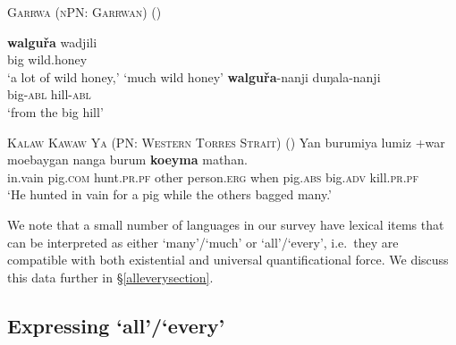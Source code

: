 \documentclass[12pt,egregdoesnotlikesansseriftitles]{scrartcl}
\begin{document}
\begin{exe}
  \ex \textsc{Garrwa (nPN: Garrwan)} \hfill(\citealt{furby77}) \label{bigquant1}
  \begin{xlist}
    \ex \gll \textbf{walgu\v{r}a} wadjili \\
    big wild.honey\\
    \glt `a lot of wild honey,' `much wild honey' %
    \ex \gll \textbf{walgu\v{r}a}-nanji duŋala-nanji\\
    big-\textsc{abl} hill-\textsc{abl}\\
    \glt `from the big hill' %
\end{xlist}    
  \ex \textsc{Kalaw Kawaw Ya (PN: Western Torres Strait)} \hfill(\citealt[141]{fo91}) \label{bigquant2}
  \gll Yan burumiya lumiz +war moebaygan nanga burum        \textbf{koeyma}    mathan.\\
  in.vain pig.\textsc{com} hunt.\textsc{pr.pf} other person.\textsc{erg} when   pig.\textsc{abs}    big.\textsc{adv}    kill.\textsc{pr.pf}\\
  \glt `He hunted in vain for a pig while the others bagged many.'
  
\end{exe}

We note  that a small number of languages in our survey have lexical items that can be interpreted as either `many'/`much' or `all'/`every', i.e.\ they are compatible with both existential and universal quantificational force. We discuss this data further in \S\ref{alleverysection}.

\subsection{Expressing `all'/`every' \label{alleverysection}}
\end{document}

